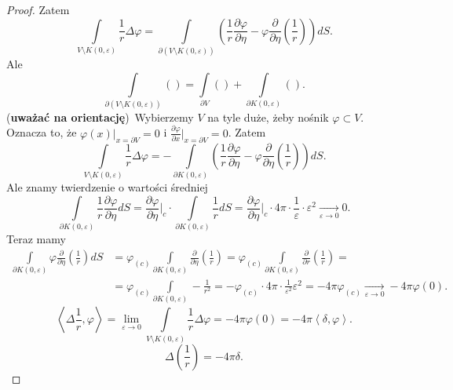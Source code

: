 \documentclass[../main.tex]{subfiles}
\begin{document}
\begin{proof}
    Zatem
    \[
        \int\limits_{V\setminus K(0,\varepsilon)} \frac{1}{r}\Delta \varphi = \int\limits_{\partial\left( V\setminus K(0,\varepsilon) \right) }\left( \frac{1}{r}\frac{\partial \varphi}{\partial \eta} - \varphi \frac{\partial }{\partial \eta} \left( \frac{1}{r} \right)  \right)dS
    .\]
Ale
\[
    \int\limits_{\partial\left( V\setminus K(0,\varepsilon) \right) }\left(  \right) = \int\limits_{\partial V}\left( \right) + \int\limits_{\partial K(0,\varepsilon)}\left(  \right)
.\]
(\textbf{uważać na orientację})\
    Wybierzemy $V$ na tyle duże, żeby nośnik $\varphi\subset V$. Oznacza to, że $\varphi(x)\Big|_{x=\partial V}= 0$ i $\frac{\partial \varphi}{\partial x} \Big|_{x=\partial V} = 0$.
    Zatem
    \[
        \int\limits_{V\setminus K(0,\varepsilon)}\frac{1}{r}\Delta \varphi = - \int\limits_{\partial K(0,\varepsilon)}\left( \frac{1}{r}\frac{\partial \varphi}{\partial \eta} - \varphi \frac{\partial }{\partial \eta} \left( \frac{1}{r} \right)  \right) dS
    .\]
Ale znamy twierdzenie o wartości średniej
\[
    \int\limits_{\partial K(0,\varepsilon)}\frac{1}{r} \frac{\partial \varphi}{\partial \eta} dS = \frac{\partial \varphi}{\partial \eta} \Big|_{c} \cdot \int\limits_{\partial K(0,\varepsilon)}\frac{1}{r}dS = \frac{\partial \varphi}{\partial \eta} \Big|_c \cdot 4\pi \cdot \frac{1}{\varepsilon} \cdot \varepsilon^2 \underset{\varepsilon\to 0}{\longrightarrow} 0
.\]
Teraz mamy
\begin{align*}
    \int\limits_{\partial K(0,\varepsilon)}\varphi \frac{\partial }{\partial \eta} \left( \frac{1}{r} \right) dS &= \varphi_{(c)}\int\limits_{\partial K(0,\varepsilon)}\frac{\partial }{\partial \eta} \left( \frac{1}{r} \right) = \varphi_{(c)}\int\limits_{\partial K(0,\varepsilon)} \frac{\partial }{\partial r} \left( \frac{1}{r} \right) =\\
    &= \varphi_{(c)}\int\limits_{\partial K(0,\varepsilon)} -\frac{1}{r^2} = -\varphi_{(c)}\cdot 4\pi \cdot \frac{1}{\varepsilon^2}\varepsilon^2 = -4\pi \varphi_{(c)} \underset{\varepsilon\to 0}{\longrightarrow} -4\pi \varphi(0)
.\end{align*}
\[
    \left<\Delta \frac{1}{r}, \varphi \right> = \lim_{\varepsilon \to 0}\int\limits_{V\setminus K(0,\varepsilon)}\frac{1}{r}\Delta \varphi= -4\pi \varphi(0) = -4\pi \left<\delta, \varphi \right>
.\]
\[
    \Delta\left( \frac{1}{r} \right) = -4\pi \delta
.\]
\end{proof}
\end{document}
